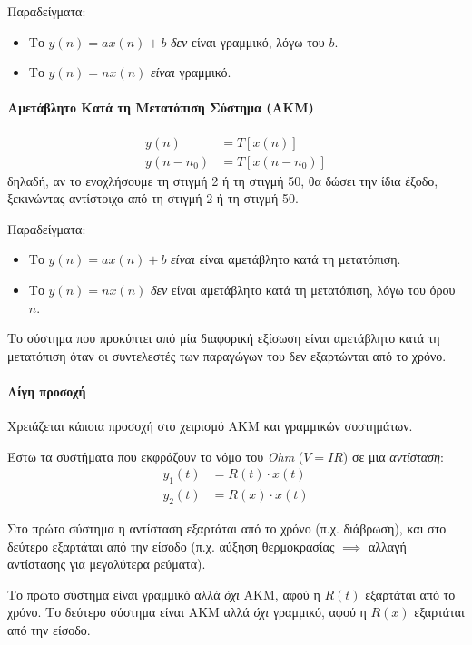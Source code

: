 \documentclass[11pt,a4paper,notitlepage,fleqn]{article}
\begin{document}
Παραδείγματα:
\begin{itemize}
	\item Το \( y(n) = ax(n) + b \) \textit{δεν} είναι γραμμικό, λόγω του \( b \).
	\item Το \( y(n) = nx(n) \) \textit{είναι} γραμμικό.
\end{itemize}

\paragraph{Αμετάβλητο Κατά τη Μετατόπιση Σύστημα (ΑΚΜ)}
\begin{align*}
	y(n) &= T\left[x(n)\right] \\
	y(n-n_0) &= T\left[x(n-n_0)\right]
\end{align*}
δηλαδή, αν το ενοχλήσουμε τη στιγμή 2 ή τη στιγμή 50, θα δώσει την ίδια έξοδο, ξεκινώντας αντίστοιχα
από τη στιγμή 2 ή τη στιγμή 50.

Παραδείγματα:
\begin{itemize}
	\item Το \( y(n) = ax(n) + b \) \textit{είναι} είναι αμετάβλητο κατά τη μετατόπιση.
	\item Το \( y(n) = nx(n) \) \textit{δεν} είναι αμετάβλητο κατά τη μετατόπιση, λόγω του όρου \( n \).
\end{itemize}

Το σύστημα που προκύπτει από μία διαφορική εξίσωση είναι αμετάβλητο κατά τη μετατόπιση όταν οι συντελεστές των παραγώγων του δεν εξαρτώνται από το χρόνο.

\paragraph{Λίγη προσοχή}
Χρειάζεται κάποια προσοχή στο χειρισμό ΑΚΜ και γραμμικών συστημάτων.

Έστω τα συστήματα που εκφράζουν το νόμο του \emph{Ohm} (\( V=IR \)) σε μια \emph{αντίσταση}:
\begin{align*}
	y_1(t) &= R(t) \cdot x(t)\\
	y_2(t) &= R(x) \cdot x(t)
\end{align*}

Στο πρώτο σύστημα η αντίσταση εξαρτάται από το χρόνο (π.χ. διάβρωση), και στο δεύτερο εξαρτάται από την είσοδο (π.χ. αύξηση θερμοκρασίας \( \implies \) αλλαγή αντίστασης για μεγαλύτερα ρεύματα).

Το πρώτο σύστημα είναι γραμμικό αλλά \emph{όχι} ΑΚΜ, αφού η \( R(t) \) εξαρτάται από το χρόνο.
Το δεύτερο σύστημα είναι ΑΚΜ αλλά \emph{όχι} γραμμικό, αφού η \( R(x) \) εξαρτάται από την είσοδο.
\end{document}
